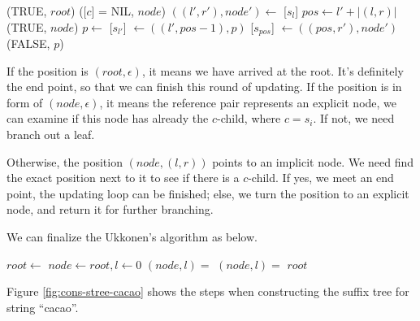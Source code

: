 \documentclass{article}
\begin{document}
\begin{algorithmic}
      \State \Return (TRUE, $root$)
    \Else
      \State \Return ([$c$] = NIL, $node$)
    \EndIf
  \Else
    \State $((l', r'), node') \gets$ [$s_l$]
    \State $pos \gets l' + |(l, r)|$
      \State \Return (TRUE, $node$)
    \Else
      \State $p \gets$ 
      \State {}[$s_{l'}$] $\gets ((l', pos-1), p)$
      \State {}[$s_{pos}$] $\gets ((pos, r'), node')$
      \State \Return (FALSE, $p$)
    \EndIf
  \EndIf
\EndFunction
\end{algorithmic}

If the position is $(root, \epsilon)$, it means we have arrived at the root.
It's definitely the end point, so that we can finish this round of updating.
If the position is in form of $(node, \epsilon)$, it means the reference pair represents
an explicit node, we can examine if this node has already the $c$-child, where $c=s_i$.
If not, we need branch out a leaf.

Otherwise, the position $(node, (l, r))$ points to an implicit node.
We need find the exact position next to it to see if there is a $c$-child.
If yes, we meet an end point, the updating loop can be finished; else, we turn
the position to an explicit node, and return it for further branching.

We can finalize the Ukkonen's algorithm as below.

\begin{algorithmic}[1]
  \State $root \gets$ 
  \State $node \gets root, l \gets 0$
    \State $(node, l) = $ 
    \State $(node, l) = $ 
  \EndFor
  \State \Return $root$
\EndFunction
\end{algorithmic}

Figure \ref{fig:cons-stree-cacao} shows the steps when constructing the
suffix tree for string ``cacao''.
\end{document}
